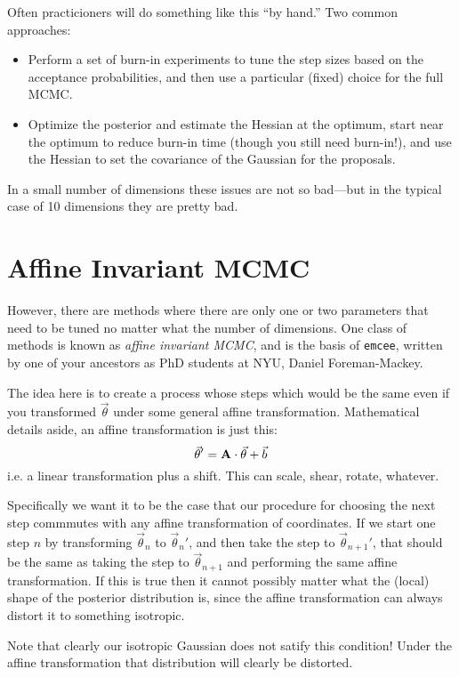 Often practicioners will do something like this ``by hand.'' Two
common approaches:
\begin{itemize}
\item Perform a set of burn-in experiments to tune the step sizes
based on the acceptance probabilities, and then use a particular
(fixed) choice for the full MCMC.
\item Optimize the posterior and estimate the Hessian at the optimum,
start near the optimum to reduce burn-in time (though you still need
burn-in!), and use the Hessian to set the covariance of the Gaussian
for the proposals.
\end{itemize}

In a small number of dimensions these issues are not so bad---but in
the typical case of 10 dimensions they are pretty bad.

\section{Affine Invariant MCMC}

However, there are methods where there are only one or two parameters
that need to be tuned no matter what the number of dimensions. One
class of methods is known as {\it affine invariant MCMC}, and is the
basis of {\tt emcee}, written by one of your ancestors as PhD students
at NYU, Daniel Foreman-Mackey.

The idea here is to create a process whose steps which would be the
same even if you transformed $\vec{\theta}$ under some general affine
transformation. Mathematical details aside, an affine transformation
is just this:
\begin{equation}
\vec{\theta}' = {\bf A}\cdot\vec{\theta} + \vec{b}
\end{equation}
i.e. a linear transformation plus a shift. This can scale, shear,
rotate, whatever.

Specifically we want it to be the case that our procedure for choosing
the next step commmutes with any affine transformation of
coordinates. If we start one step $n$ by transforming $\vec{\theta}_n$
to ${\vec{\theta}_{n}}'$, and then take the step to
${\vec{\theta}_{n+1}}'$, that should be the same as taking the step to
$\vec{\theta}_{n+1}$ and performing the same affine transformation.
If this is true then it cannot possibly matter what the (local) shape
of the posterior distribution is, since the affine transformation can
always distort it to something isotropic.

Note that clearly our isotropic Gaussian does not satify this
condition! Under the affine transformation that distribution will
clearly be distorted.

